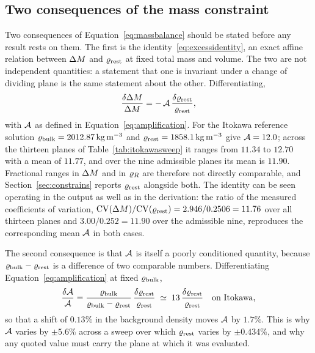\subsection{Two consequences of the mass constraint}
\label{sec:methods:identity}

Two consequences of Equation~\eqref{eq:massbalance} should be stated
before any result rests on them. The first is the
identity~\eqref{eq:excessidentity}, an exact affine relation between
$\Delta M$ and $\varrho_{\mathrm{rest}}$ at fixed total mass and volume. The two are not
independent quantities: a statement that one is invariant under a change
of dividing plane is the same statement about the other. Differentiating,
%
\begin{equation}
\frac{\delta \Delta M}{\Delta M}
= -\,\mathcal{A}\,\frac{\delta \varrho_{\mathrm{rest}}}{\varrho_{\mathrm{rest}}} ,
\label{eq:excessamplify}
\end{equation}
%
with $\mathcal{A}$ as defined in Equation~\eqref{eq:amplification}. For the
Itokawa reference solution
$\varrho_{\mathrm{bulk}} = \SI{2012.87}{\kilo\gram\per\cubic\metre}$ and
$\varrho_{\mathrm{rest}} = \SI{1858.1}{\kilo\gram\per\cubic\metre}$ give
$\mathcal{A} = 12.0$; across the thirteen planes of
Table~\ref{tab:itokawasweep} it ranges from $11.34$ to $12.70$ with a
mean of $11.77$, and over the nine admissible planes its mean is $11.90$.
Fractional ranges in $\Delta M$ and in $\varrho_{R}$ are therefore not directly
comparable, and Section~\ref{sec:constrains} reports $\varrho_{\mathrm{rest}}$
alongside both. The identity can be seen operating in the output as well
as in the derivation: the ratio of the measured coefficients of
variation, $\mathrm{CV}(\Delta M)/\mathrm{CV}(\varrho_{\mathrm{rest}}) = 2.946/0.2506 = 11.76$ over all
thirteen planes and $3.00/0.252 = 11.90$ over the admissible nine,
reproduces the corresponding mean $\mathcal{A}$ in both cases.

The second consequence is that $\mathcal{A}$ is itself a poorly conditioned
quantity, because $\varrho_{\mathrm{bulk}} - \varrho_{\mathrm{rest}}$ is a difference of two
comparable numbers. Differentiating
Equation~\eqref{eq:amplification} at fixed $\varrho_{\mathrm{bulk}}$,
%
\begin{equation}
\frac{\delta \mathcal{A}}{\mathcal{A}}
 = \frac{\varrho_{\mathrm{bulk}}}{\varrho_{\mathrm{bulk}} - \varrho_{\mathrm{rest}}}\,
   \frac{\delta \varrho_{\mathrm{rest}}}{\varrho_{\mathrm{rest}}}
 \;\simeq\; 13\,\frac{\delta \varrho_{\mathrm{rest}}}{\varrho_{\mathrm{rest}}}
\quad\text{on Itokawa,}
\label{eq:ampsensitivity}
\end{equation}
%
so that a shift of $0.13\%$ in the background density moves $\mathcal{A}$ by
$1.7\%$. This is why $\mathcal{A}$ varies by $\pm5.6\%$ across a sweep over
which $\varrho_{\mathrm{rest}}$ varies by $\pm0.434\%$, and why any quoted value must
carry the plane at which it was evaluated.

